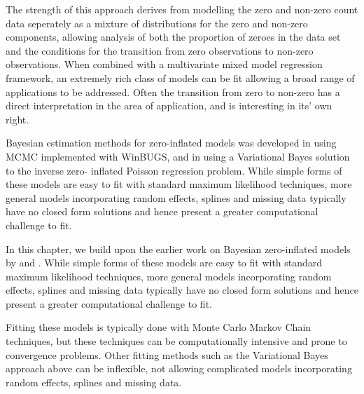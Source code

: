 The strength of this approach derives from modelling the zero and non-zero count data seperately as a mixture
of distributions for the zero and non-zero components, allowing analysis of both the proportion of zeroes in
the data set and the conditions for the transition from zero observations to non-zero observations. When
combined with a multivariate mixed model regression framework, an extremely rich class of models can be fit
allowing a broad range of applications to be addressed. Often the transition from zero to non-zero has a
direct interpretation in the area of application, and is interesting in its' own right.

Bayesian estimation methods for zero-inflated models was developed in \cite{Ghosh2006} using MCMC implemented
with WinBUGS, and in \cite{Vatsa2014} using a Variational Bayes solution to the inverse zero- inflated
Poisson regression problem. While simple forms of these models are easy to fit with standard  maximum
likelihood techniques, more general models incorporating random effects, splines and missing data  typically
have no closed form solutions and hence present a greater computational challenge to fit.

In this chapter, we build upon the earlier work on Bayesian zero-inflated models by \cite{Ghosh2006} and
\cite{Vatsa2014}. While simple forms of these models are easy to fit with standard maximum likelihood
techniques, more general models incorporating random effects, splines and missing data typically have no
closed form solutions and hence present a greater computational challenge to fit.

Fitting these models is typically done with Monte Carlo Markov Chain techniques, but these techniques can be
computationally intensive and prone to convergence problems.  Other fitting methods such as the Variational
Bayes approach above can be inflexible, not allowing complicated models incorporating random effects, splines
and missing data.

